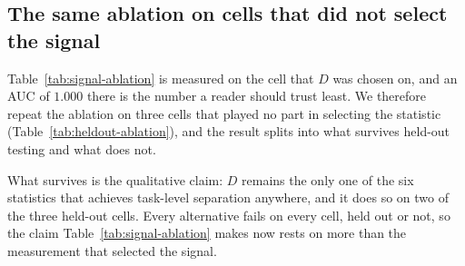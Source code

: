 \begin{table}[t]
\centering
\caption{Gate-signal ablation on Qwen2.5-1.5B-Instruct (RULER 4K, $N=50$ per
task, one shared prefill per input). Each cheap prefill statistic is tested
for separating the capacity-bound anchor (NIAH-MK3, and MK3+MK2) from the
dilution-prone tasks (vt, fwe, qa\_1, multivalue). ``Sep.'' = a single
threshold puts the capacity-bound task mean(s) strictly on one side of all
four dilution task means; AUCs are per-input and oriented per signal
(0.5 = chance); ``MK mono.'' = task means are monotone along the
MK1$\to$MK2$\to$MK3 distractor gradient; $r$ = Pearson correlation with $D$.}
\label{tab:signal-ablation}
\end{table}

\subsection{The same ablation on cells that did not select the signal}
\label{subsec:heldout-ablation}

Table~\ref{tab:signal-ablation} is measured on the cell that $D$ was chosen on,
and an AUC of $1.000$ there is the number a reader should trust least. We
therefore repeat the ablation on three cells that played no part in selecting
the statistic (Table~\ref{tab:heldout-ablation}), and the result splits into
what survives held-out testing and what does not.

What survives is the qualitative claim: $D$ remains the only one of the six
statistics that achieves task-level separation anywhere, and it does so on
two of the three held-out cells. Every alternative fails on every cell,
held out or not, so the claim Table~\ref{tab:signal-ablation} makes now
rests on more than the measurement that selected the signal.

